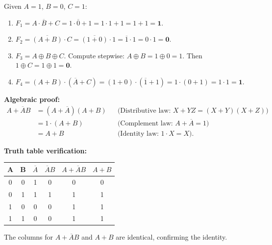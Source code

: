 \documentclass[11pt]{article}
\begin{document}
\begin{corrige}
Given \(A = 1\), \(B = 0\), \(C = 1\):
\begin{enumerate}
\item \(F_1 = A \cdot \overline{B} + C = 1 \cdot \overline{0} + 1 = 1 \cdot 1 + 1 = 1 + 1 = \mathbf{1}\).
\item \(F_2 = \overline{(A + B)} \cdot C = \overline{(1 + 0)} \cdot 1 = \overline{1} \cdot 1 = 0 \cdot 1 = \mathbf{0}\).
\item \(F_3 = A \oplus B \oplus C\). Compute stepwise: \(A \oplus B = 1 \oplus 0 = 1\). Then \(1 \oplus C = 1 \oplus 1 = \mathbf{0}\).
\item \(F_4 = (A + B) \cdot (\overline{A} + C) = (1 + 0) \cdot (\overline{1} + 1) = 1 \cdot (0 + 1) = 1 \cdot 1 = \mathbf{1}\).
\end{enumerate}
\end{corrige}

\begin{corrige}
\textbf{Algebraic proof:}
\[
\begin{aligned}
A + \overline{A}B &= (A + \overline{A})(A + B) && \text{(Distributive law: } X + YZ = (X+Y)(X+Z)\text{)} \\
&= 1 \cdot (A + B) && \text{(Complement law: } A + \overline{A} = 1\text{)} \\
&= A + B && \text{(Identity law: } 1 \cdot X = X\text{)}.
\end{aligned}
\]

\textbf{Truth table verification:}

\begin{center}
\begin{tabular}{|c|c|c|c|c|c|}
\hline
A & B & \(\overline{A}\) & \(\overline{A}B\) & \(A + \overline{A}B\) & \(A + B\) \\
\hline
0 & 0 & 1 & 0 & 0 & 0 \\
0 & 1 & 1 & 1 & 1 & 1 \\
1 & 0 & 0 & 0 & 1 & 1 \\
1 & 1 & 0 & 0 & 1 & 1 \\
\hline
\end{tabular}
\end{center}
The columns for \(A + \overline{A}B\) and \(A + B\) are identical, confirming the identity.
\end{corrige}
\end{document}
